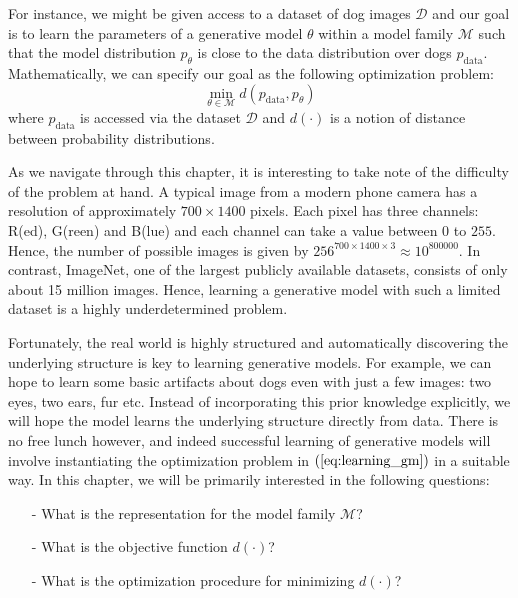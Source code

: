 For instance, we might be given access to a dataset of dog images $\mathcal{D}$ and
our goal is to learn the parameters of  a generative model $\theta$ within a model 
family $\mathcal{M}$ such that
the model distribution $p_\theta$ is close to the data distribution over dogs
$p_{\mathrm{data}}$. Mathematically, we can specify our goal as the
following optimization problem: 
\begin{equation}
\min_{\theta\in \mathcal{M}}d(p_{\mathrm{data}}, p_{\theta})
\label{eq:learning_gm}
\end{equation}
where $p_{\mathrm{data}}$ is accessed via the dataset
$\mathcal{D}$ and $d(\cdot)$ is a notion of distance between probability distributions.

As we navigate through this chapter, it is interesting to take note of
the difficulty of the problem at hand. A typical image from a modern
phone camera has a resolution of approximately $700 \times 1400$ pixels.
Each pixel has three channels: R(ed), G(reen) and B(lue) and each
channel can take a value between $0$ to $255$. Hence, the number of possible
images is given by $256^{700 \times 1400 \times 3}\approx 10 ^{800000}$.
In contrast, ImageNet, one of the largest publicly available datasets,
consists of only about 15 million images. Hence, learning a generative
model with such a limited dataset is a highly underdetermined problem.

Fortunately, the real world is highly structured and automatically
discovering the underlying structure is key to learning generative
models. For example, we can hope to learn some basic artifacts about
dogs even with just a few images: two eyes, two ears, fur etc. Instead
of incorporating this prior knowledge explicitly, we will hope the model
learns the underlying structure directly from data. There is no free
lunch however, and indeed successful learning of generative models will
involve instantiating the optimization problem in
$(\ref{eq:learning_gm})$ in a suitable way. In this chapter, we will be
primarily interested in the following questions:

\begin{itemize}
\setlength{\parskip}{0pt}
\item[-]
What is the representation for the model family $\mathcal{M}$?

\item[-]
What is the objective function $d(\cdot)$?

\item[-]
What is the optimization procedure for minimizing $d(\cdot)$?
\end{itemize}

